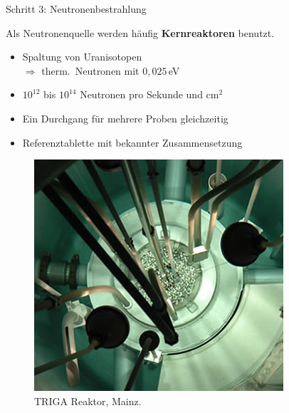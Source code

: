 \documentclass[xcolor=x11names, aspectratio=169]{beamer}
\begin{document}
\begin{frame}{Schritt 3: Neutronenbestrahlung}
\begin{minipage}{0.52\textwidth}\flushleft
Als Neutronenquelle werden häufig \textbf{Kernreaktoren} benutzt.\smallskip

\begin{itemize}
\item Spaltung von Uranisotopen\\$\Rightarrow$ therm.\ Neutronen mit $0,025$\,eV
\item $10^{12}$ bis $10^{14}$ Neutronen pro Sekunde und cm$^2$
\item Ein Durchgang für mehrere Proben gleichzeitig
\item \alert{Referenztablette} mit bekannter Zusammensetzung
\end{itemize}
\end{minipage}\hfill
\begin{minipage}{0.44\textwidth}
\begin{figure}
\includegraphics[width=\textwidth]{img/reactor-mainz.png}
\caption{TRIGA Reaktor, Mainz.}
\end{figure}
\end{minipage}
\end{frame}
\end{document}
